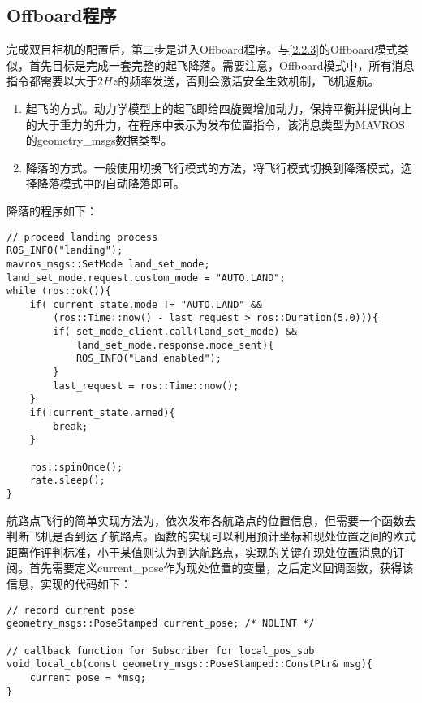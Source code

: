 \subsection{Offboard程序} \label{4.2.2}

完成双目相机的配置后，第二步是进入Offboard程序。与\ref{2.2.3}的Offboard模式类似，首先目标是完成一套完整的起飞降落。需要注意，Offboard模式中，所有消息指令都需要以大于$2Hz$的频率发送，否则会激活安全生效机制，飞机返航。

\begin{enumerate}
	\item 起飞的方式。动力学模型上的起飞即给四旋翼增加动力，保持平衡并提供向上的大于重力的升力，在程序中表示为发布位置指令，该消息类型为MAVROS的geometry\_msgs数据类型。
	\item 降落的方式。一般使用切换飞行模式的方法，将飞行模式切换到降落模式，选择降落模式中的自动降落即可。
\end{enumerate}

降落的程序如下：

\begin{verbatim}
// proceed landing process
ROS_INFO("landing");
mavros_msgs::SetMode land_set_mode;
land_set_mode.request.custom_mode = "AUTO.LAND";
while (ros::ok()){
    if( current_state.mode != "AUTO.LAND" &&
        (ros::Time::now() - last_request > ros::Duration(5.0))){
        if( set_mode_client.call(land_set_mode) &&
            land_set_mode.response.mode_sent){
            ROS_INFO("Land enabled");
        }
        last_request = ros::Time::now();
    }
    if(!current_state.armed){
        break;
    }

    ros::spinOnce();
    rate.sleep();
}
\end{verbatim}

航路点飞行的简单实现方法为，依次发布各航路点的位置信息，但需要一个函数去判断飞机是否到达了航路点。函数的实现可以利用预计坐标和现处位置之间的欧式距离作评判标准，小于某值则认为到达航路点，实现的关键在现处位置消息的订阅。首先需要定义current\_pose作为现处位置的变量，之后定义回调函数，获得该信息，实现的代码如下：

\begin{verbatim}
// record current pose
geometry_msgs::PoseStamped current_pose; /* NOLINT */

// callback function for Subscriber for local_pos_sub
void local_cb(const geometry_msgs::PoseStamped::ConstPtr& msg){
    current_pose = *msg;
}
\end{verbatim}

